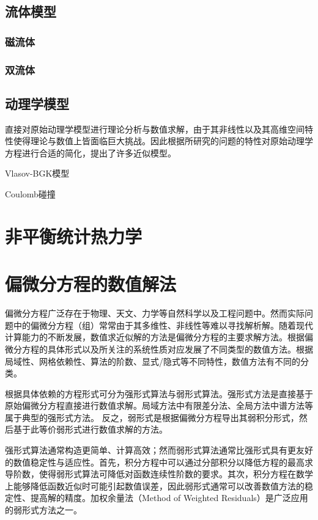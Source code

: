 \subsection{流体模型}
\label{流体模型}

\subsubsection{磁流体}
\label{磁流体}

\subsubsection{双流体}
\label{双流体}


\subsection{动理学模型}
\label{动理学模型}

    直接对原始动理学模型进行理论分析与数值求解，由于其非线性以及其高维空间特性使得理论与数值上皆面临巨大挑战。因此根据所研究的问题的特性对原始动理学方程进行合适的简化，提出了许多近似模型。

    Vlasov-BGK模型

    Coulomb碰撞\cite{Heikkinen2007}
   
\section{非平衡统计热力学}
\label{非平衡统计热力学}

\section{偏微分方程的数值解法}
\label{偏微分方程的数值解法}

偏微分方程广泛存在于物理、天文、力学等自然科学以及工程问题中。然而实际问题中的偏微分方程（组）常常由于其多维性、非线性等难以寻找解析解。随着现代计算能力的不断发展，数值求近似解的方法是偏微分方程的主要求解方法。根据偏微分方程的具体形式以及所关注的系统性质对应发展了不同类型的数值方法。根据局域性、网格依赖性、算法的阶数、显式/隐式等不同特性，数值方法有不同的分类。

根据具体依赖的方程形式可分为强形式算法与弱形式算法。强形式方法是直接基于原始偏微分方程直接进行数值求解。局域方法中有限差分法、全局方法中谱方法等属于典型的强形式方法。 反之，弱形式是根据偏微分方程导出其弱积分形式，然后基于此等价弱形式进行数值求解的方法。

强形式算法通常构造更简单、计算高效；然而弱形式算法通常比强形式具有更友好的数值稳定性与适应性。首先，积分方程中可以通过分部积分以降低方程的最高求导阶数，使得弱形式算法可降低对函数连续性阶数的要求。其次，积分方程在数学上能够降低函数近似时可能引起数值误差，因此弱形式通常可以改善数值方法的稳定性、提高解的精度。加权余量法（Method of Weighted Residuals）是广泛应用的弱形式方法之一。

